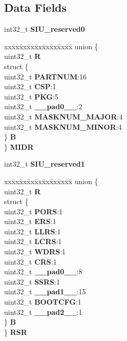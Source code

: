 \subsection*{Data Fields}
\begin{DoxyCompactItemize}
\item 
\mbox{\label{structSIU__tag_ae252f398a0efbb97f53bcdd1544ef242}} 
int32\+\_\+t {\bfseries S\+I\+U\+\_\+reserved0}
\item 
\mbox{\label{structSIU__tag_a02964f68fa5b4e5a241f6329056a62f6}} 
\begin{tabbing}
xx\=xx\=xx\=xx\=xx\=xx\=xx\=xx\=xx\=\kill
union \{\\
\>uint32\_t {\bfseries R}\\
\>struct \{\\
\>\>uint32\_t {\bfseries PARTNUM}:16\\
\>\>uint32\_t {\bfseries CSP}:1\\
\>\>uint32\_t {\bfseries PKG}:5\\
\>\>uint32\_t {\bfseries \_\_pad0\_\_}:2\\
\>\>uint32\_t {\bfseries MASKNUM\_MAJOR}:4\\
\>\>uint32\_t {\bfseries MASKNUM\_MINOR}:4\\
\>\} {\bfseries B}\\
\} {\bfseries MIDR}\\

\end{tabbing}\item 
\mbox{\label{structSIU__tag_a68a0165fa89cb62e1b5e913271dcab3e}} 
int32\+\_\+t {\bfseries S\+I\+U\+\_\+reserved1}
\item 
\mbox{\label{structSIU__tag_abc114b2ef94f06f51dbc39198856f0f4}} 
\begin{tabbing}
xx\=xx\=xx\=xx\=xx\=xx\=xx\=xx\=xx\=\kill
union \{\\
\>uint32\_t {\bfseries R}\\
\>struct \{\\
\>\>uint32\_t {\bfseries PORS}:1\\
\>\>uint32\_t {\bfseries ERS}:1\\
\>\>uint32\_t {\bfseries LLRS}:1\\
\>\>uint32\_t {\bfseries LCRS}:1\\
\>\>uint32\_t {\bfseries WDRS}:1\\
\>\>uint32\_t {\bfseries CRS}:1\\
\>\>uint32\_t {\bfseries \_\_pad0\_\_}:8\\
\>\>uint32\_t {\bfseries SSRS}:1\\
\>\>uint32\_t {\bfseries \_\_pad1\_\_}:15\\
\>\>uint32\_t {\bfseries BOOTCFG}:1\\
\>\>uint32\_t {\bfseries \_\_pad2\_\_}:1\\
\>\} {\bfseries B}\\
\} {\bfseries RSR}\\


\end{tabbing}
\end{DoxyCompactItemize}
